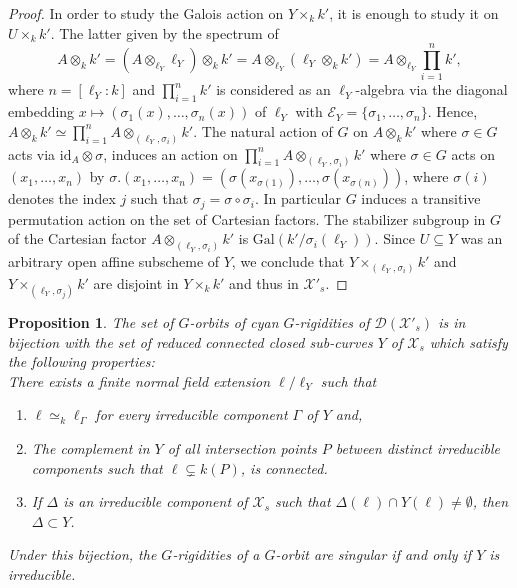 \documentclass[a4paper,12pt,reqno]{amsart}
\newcommand\mc\mathcal
\newtheorem{prop}[thm]{Proposition}
\theoremstyle{definition}
\numberwithin{equation}{thm}
\begin{document}
\begin{proof}
In order to study the Galois action on $Y\times_k k'$, it is enough to study it on $U \times_k k'$.
The latter given by the spectrum of $$A \otimes_k k'= (A \otimes_{\ell_Y} \ell_Y) \otimes_k k' =A \otimes_{\ell_Y} (\ell_Y\otimes_k k')= A \otimes_{\ell_Y} \prod_{i=1}^n k',$$
where 
$n=[\ell_Y : k]$ and  $\prod_{i=1}^n k'$ is considered as an $\ell_Y$-algebra via the diagonal embedding $x \mapsto (\sigma_1(x), \ldots, \sigma_n(x))$ of $\ell_Y$ with  $\mc{E}_Y=\{\sigma_1,\ldots, \sigma_n\}$. 
Hence, $A \otimes_k k' \simeq \prod_{i=1}^n A \otimes_{(\ell_Y, \sigma_i)} k'$. The natural action of $G$ on $A\otimes_k k'$ where  $\sigma \in G$ acts via $\mathrm{id}_A \otimes \sigma$, induces  an action on  $\prod_{i=1}^n A \otimes_{(\ell_Y, \sigma_i)} k'$  where $\sigma \in G$ acts on 
$(x_1,\ldots, x_n)$ by $\sigma. (x_1,\ldots, x_n)= (\sigma(x_{\sigma(1)}), \ldots, \sigma(x_{\sigma(n)}))$, where $\sigma(i)$ denotes the index $j$ such that
$\sigma_j = \sigma \circ \sigma_i$. In particular $G$ induces a transitive permutation action on the set of Cartesian factors.
 The stabilizer subgroup in $G$ of the Cartesian factor $A \otimes_{(\ell_Y, \sigma_i)} k'$  is  $\mathrm{Gal}(k'/\sigma_i(\ell_Y))$. Since $U \subseteq Y$ was an arbitrary open affine subscheme of $Y$, we conclude that  $Y\times_{(\ell_Y, \sigma_i)} k'$ and $Y\times_{(\ell_Y, \sigma_j)} k'$ are disjoint in $Y\times_k k'$  and thus in $\mc{X}'_s$. 
 \end{proof}


\begin{prop}\label{rigidity-class} 
The set of $G$-orbits of cyan $G$-rigidities of $\mc{D}(\mc{X}'_s)$ is in bijection with the set of reduced connected closed sub-curves  $Y$ of $\mc{X}_s$ which satisfy the following properties: \\
There exists a finite normal field extension $\ell/ \ell_Y$ such that
\begin{enumerate}
\item[$(i)$]  $\ell \simeq_k \ell_\Gamma$ for every irreducible component $\Gamma$ of $Y$ and,
\item[$(ii)$] The complement in $Y$ of all intersection points $P$ between distinct irreducible components such that $\ell \subsetneq k(P)$, is connected.
\item[$(iii)$] If $\Delta$ is an irreducible component of $\mc{X}_s$ such that $\Delta(\ell) \cap Y(\ell) \neq \emptyset$, then $\Delta \subset Y$.
\end{enumerate}
Under this bijection, the $G$-rigidities of a $G$-orbit are singular if and only if $Y$ is irreducible.
\end{prop}
\end{document}
